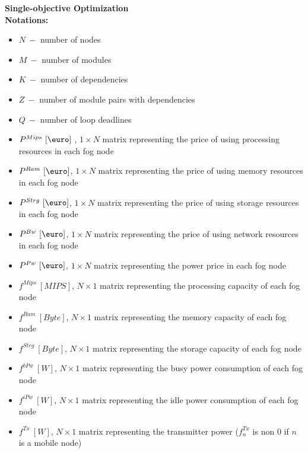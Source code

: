 \documentclass{article}
\begin{document}
\newcommand{\SubItem}[1]{
    {\setlength\itemindent{15pt} \item[-] #1}
}

\pagebreak
\noindent\textbf{Single-objective Optimization}\\[6pt]
\noindent\textbf{Notations:}
\begin{itemize}
	\item $N~-$ number of nodes
	\item $M~-$ number of modules
	\item $K~-$ number of dependencies
	\item $Z~-$ number of module pairs with dependencies
	\item $Q~-$ number of loop deadlines\\
	
	\item $P^{Mips}~[\mbox{\euro}]~$, $1\times N$ matrix representing the price of using processing resources in each fog node
	\item $P^{Ram}~[\mbox{\euro}]$, $1\times N$ matrix representing the price of using memory resources in each fog node
	\item $P^{Strg}~[\mbox{\euro}]$, $1\times N$ matrix representing the price of using storage resources in each fog node
	\item $P^{Bw}~[\mbox{\euro}]$, $1\times N$ matrix representing the price of using network resources in each fog node
	\item $P^{Pw}~[\mbox{\euro}]$, $1\times N$ matrix representing the power price in each fog node\\
	
	\item $f^{Mips}~[MIPS]$, $N\times 1$ matrix representing the processing capacity of each fog node
	\item $f^{Ram}~[Byte]$, $N\times 1$ matrix representing the memory capacity of each fog node
	\item $f^{Strg}~[Byte]$, $N\times 1$ matrix representing the storage capacity of each fog node
	\item $f^{bPw}~[W]$, $N\times 1$ matrix representing the busy power consumption of each fog node
	\item $f^{iPw}~[W]$, $N\times 1$ matrix representing the idle power consumption of each fog node
	\item $f^{Tx}~[W]$, $N\times 1$ matrix representing the transmitter power ($f^{Tx}_n$ is non 0 if $n$ is a mobile node)\\
	

\end{itemize}
\end{document}

